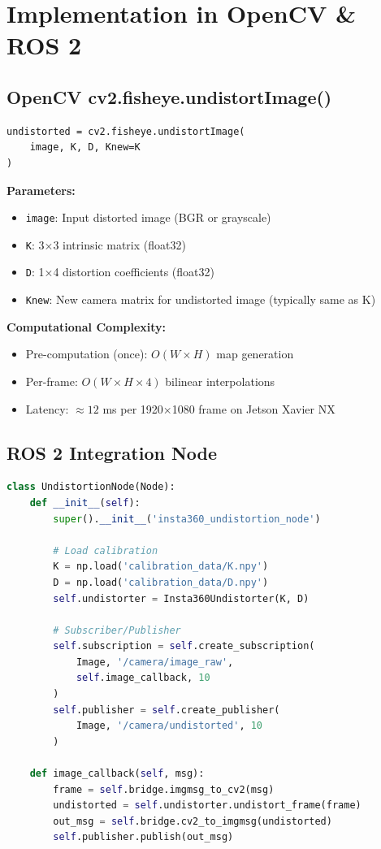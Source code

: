 \documentclass[11pt,a4paper,oneside]{article}
\begin{document}
\section{Implementation in OpenCV \& ROS 2}
\label{sec:implementation}

\subsection{OpenCV cv2.fisheye.undistortImage()}

\begin{lstlisting}
undistorted = cv2.fisheye.undistortImage(
    image, K, D, Knew=K
)
\end{lstlisting}

\textbf{Parameters:}
\begin{itemize}
    \item \texttt{image}: Input distorted image (BGR or grayscale)
    \item \texttt{K}: 3×3 intrinsic matrix (float32)
    \item \texttt{D}: 1×4 distortion coefficients (float32)
    \item \texttt{Knew}: New camera matrix for undistorted image (typically same as K)
\end{itemize}

\textbf{Computational Complexity:}
\begin{itemize}
    \item Pre-computation (once): $O(W \times H)$ map generation
    \item Per-frame: $O(W \times H \times 4)$ bilinear interpolations
    \item Latency: $\approx 12$ ms per 1920×1080 frame on Jetson Xavier NX
\end{itemize}

\subsection{ROS 2 Integration Node}

\begin{lstlisting}[language=Python]
class UndistortionNode(Node):
    def __init__(self):
        super().__init__('insta360_undistortion_node')
        
        # Load calibration
        K = np.load('calibration_data/K.npy')
        D = np.load('calibration_data/D.npy')
        self.undistorter = Insta360Undistorter(K, D)
        
        # Subscriber/Publisher
        self.subscription = self.create_subscription(
            Image, '/camera/image_raw',
            self.image_callback, 10
        )
        self.publisher = self.create_publisher(
            Image, '/camera/undistorted', 10
        )
    
    def image_callback(self, msg):
        frame = self.bridge.imgmsg_to_cv2(msg)
        undistorted = self.undistorter.undistort_frame(frame)
        out_msg = self.bridge.cv2_to_imgmsg(undistorted)
        self.publisher.publish(out_msg)
\end{lstlisting}
\end{document}
